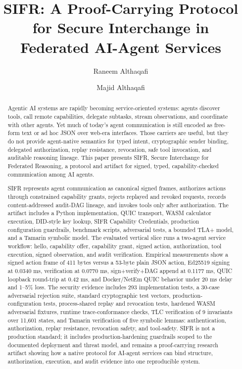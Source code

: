 \documentclass[runningheads]{llncs}
\title{SIFR: A Proof-Carrying Protocol for Secure Interchange in Federated AI-Agent Services}
\author{Raneem Althaqafi \and Majid Althaqafi}
\institute{Independent Researchers\\
\email{althaqafi.raneem@gmail.com, imajedmuhammad@gmail.com}}
\begin{document}
\maketitle

\begin{abstract}
Agentic AI systems are rapidly becoming service-oriented systems: agents discover tools, call remote capabilities, delegate subtasks, stream observations, and coordinate with other agents. Yet much of today's agent communication is still encoded as free-form text or ad hoc JSON over web-era interfaces. Those carriers are useful, but they do not provide agent-native semantics for typed intent, cryptographic sender binding, delegated authorization, replay resistance, revocation, safe tool invocation, and auditable reasoning lineage. This paper presents SIFR, Secure Interchange for Federated Reasoning, a protocol and artifact for signed, typed, capability-checked communication among AI agents.

SIFR represents agent communication as canonical signed frames, authorizes actions through constrained capability grants, rejects replayed and revoked requests, records content-addressed audit-DAG lineage, and invokes tools only after authorization. The artifact includes a Python implementation, QUIC transport, WASM calculator execution, DID-style key lookup, SIFR Capability Credentials, production configuration guardrails, benchmark scripts, adversarial tests, a bounded TLA+ model, and a Tamarin symbolic model. The evaluated vertical slice runs a two-agent service workflow: hello, capability offer, capability grant, signed action, authorization, tool execution, signed observation, and audit verification. Empirical measurements show a signed action frame of 411 bytes versus a 53-byte plain JSON action, Ed25519 signing at 0.0340 ms, verification at 0.0770 ms, sign+verify+DAG append at 0.1177 ms, QUIC loopback round-trip at 0.42 ms, and Docker/NetEm QUIC behavior under 20 ms delay and 1--5\% loss. The security evidence includes 293 implementation tests, a 30-case adversarial rejection suite, standard cryptographic test vectors, production-configuration tests, process-shared replay and revocation tests, hardened WASM adversarial fixtures, runtime trace-conformance checks, TLC verification of 9 invariants over 11,601 states, and Tamarin verification of five symbolic lemmas: authentication, authorization, replay resistance, revocation safety, and tool-safety. SIFR is not a production standard; it includes production-hardening guardrails scoped to the documented deployment and threat model, and remains a proof-carrying research artifact showing how a native protocol for AI-agent services can bind structure, authorization, execution, and audit evidence into one reproducible system.

\end{abstract}
\end{document}
